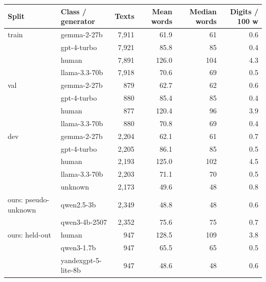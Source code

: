 \begin{tabular}{|l|l|rrrr|}
\hline
Split & Class / generator & Texts & Mean words & Median words & Digits / 100 w \\
\hline
train & gemma-2-27b & 7,911 & 61.9 & 61 & 0.6 \\
 & gpt-4-turbo & 7,921 & 85.8 & 85 & 0.4 \\
 & human & 7,891 & 126.0 & 104 & 4.3 \\
 & llama-3.3-70b & 7,918 & 70.6 & 69 & 0.5 \\
\hline
val & gemma-2-27b & 879 & 62.7 & 62 & 0.6 \\
 & gpt-4-turbo & 880 & 85.4 & 85 & 0.4 \\
 & human & 877 & 120.4 & 96 & 3.9 \\
 & llama-3.3-70b & 880 & 70.8 & 69 & 0.4 \\
\hline
dev & gemma-2-27b & 2,204 & 62.1 & 61 & 0.7 \\
 & gpt-4-turbo & 2,205 & 86.1 & 85 & 0.5 \\
 & human & 2,193 & 125.0 & 102 & 4.5 \\
 & llama-3.3-70b & 2,203 & 71.1 & 70 & 0.5 \\
 & unknown & 2,173 & 49.6 & 48 & 0.8 \\
\hline
ours: pseudo-unknown & qwen2.5-3b & 2,349 & 48.8 & 48 & 0.6 \\
 & qwen3-4b-2507 & 2,352 & 75.6 & 75 & 0.7 \\
\hline
ours: held-out & human & 947 & 128.5 & 109 & 3.8 \\
 & qwen3-1.7b & 947 & 65.5 & 65 & 0.5 \\
 & yandexgpt-5-lite-8b & 947 & 48.6 & 48 & 0.6 \\
\hline
\end{tabular}
